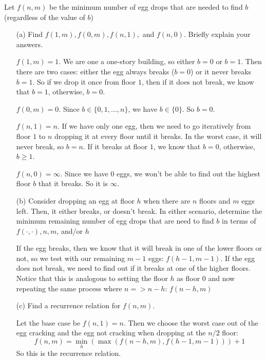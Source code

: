 \documentclass{article}
\begin{document}
Let $f(n, m)$ be the minimum number of egg drops that are needed to find $b$ (regardless of the value of $b$)
    \begin{itemize}
        \item [(a)] Find $f(1, m), f(0, m), f(n, 1),$ and $f(n, 0)$. Briefly explain your answers.
            \begin{answer}
                $f(1, m) = 1$. We are one a one-story building, so either $b = 0$ or $b = 1$. Then there are two cases: either the egg always breaks ($b = 0$) or it never breaks $b = 1$. So if we drop it once from floor $1$, then if it does not break, we know that $b = 1$, otherwise, $b = 0$.

                $f(0, m) = 0$. Since $b \in \{0, 1, \ldots, n\}$, we have $b \in \{0\}$. So $b = 0$.

                $f(n, 1) = n$. If we have only one egg, then we need to go iteratively from floor $1$ to $n$ dropping it at every floor until it breaks. In the worst case, it will never break, so $b = n$. If it breaks at floor $1$, we know that $b = 0$, otherwise, $b \geq 1$.

                $f(n, 0) = \infty$. Since we have $0$ eggs, we won't be able to find out the highest floor $b$ that it breaks. So it is $\infty$.
            \end{answer}

        \item [(b)] Consider dropping an egg at floor $h$ when there are $n$ floors and $m$ eggs left. Then, it either breaks, or doesn't break. In either scenario, determine the minimum remaining number of egg drops that are need to find $b$ in terms of $f(\cdot, \cdot), n, m$, and/or $h$
            \begin{answer}
                If the egg breaks, then we know that it will break in one of the lower floors or not, so we test with our remaining $m - 1$ eggs: $f(h-1, m-1)$. If the egg does not break, we need to find out if it breaks at one of the higher floors. Notice that this is analogous to setting the floor $h$ as floor $0$ and now repeating the same process where $n => n - h$: $f(n - h, m)$
            \end{answer}

        \item [(c)] Find a recurrence relation for $f(n, m)$.
            \begin{answer}
                Let the base case be $f(n, 1) = n$. Then we choose the worst case out of the egg cracking and the egg not cracking when dropping at the $n / 2$ floor:
                    \begin{equation*}
                        f(n, m) = \min_{h}(\max(f(n - h, m), f(h - 1, m - 1))) + 1
                    \end{equation*}
                So this is the recurrence relation.
            \end{answer}


\end{itemize}
\end{document}
